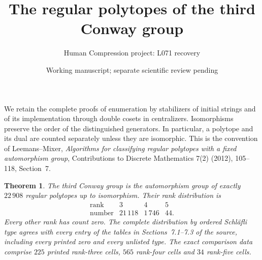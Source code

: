 \documentclass[11pt,a4paper]{article}
\title{The regular polytopes of the third Conway group}
\author{Human Compression project: L071 recovery}
\date{Working manuscript; separate scientific review pending}
\newtheorem{theorem}{Theorem}
\begin{document}
\maketitle
We retain the complete proofs of enumeration by stabilizers of initial
strings and of its implementation through double cosets in centralizers.
Isomorphisms preserve the order of the distinguished generators. In
particular, a polytope and its dual are counted separately unless they
are isomorphic. This is the convention of Leemans--Mixer,
\emph{Algorithms for classifying regular polytopes with a fixed
automorphism group}, Contributions to Discrete Mathematics 7(2)
(2012), 105--118, Section~7.

\begin{theorem}
The third Conway group is the automorphism group of exactly
$22\,908$ regular polytopes up to isomorphism. Their rank distribution is
\[
\begin{array}{c|rrr}
\text{rank}&3&4&5\\\hline
\text{number}&21\,118&1\,746&44.
\end{array}
\]
Every other rank has count zero. The complete distribution by ordered
Schl\"afli type agrees with every entry of the tables in Sections~7.1--7.3
of the source, including every printed zero and every unlisted type.
The exact comparison data comprise $225$ printed rank-three cells,
$565$ rank-four cells and $34$ rank-five cells.
\end{theorem}
\end{document}
